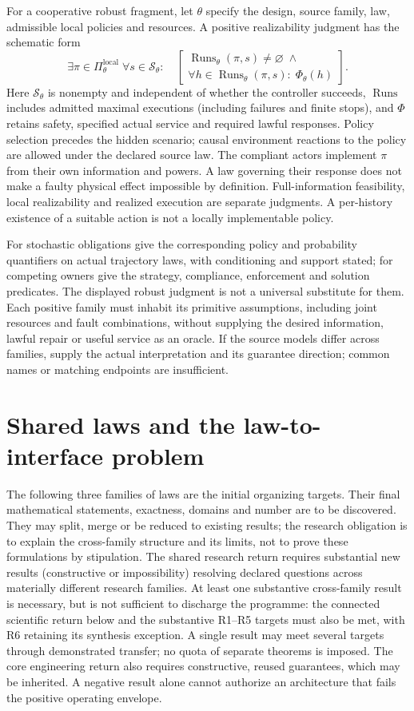 \documentclass[11pt]{article}
\newcommand{\Runs}{\operatorname{Runs}}
\begin{document}
For a cooperative robust fragment, let $\theta$ specify the design, source family, law, admissible local policies and resources. A positive realizability judgment has the schematic form
\[
 \exists\pi\in\Pi^{\mathrm{local}}_\theta\;\forall s\in\mathcal S_\theta:\quad
 \left[\begin{gathered}
 \Runs_\theta(\pi,s)\ne\varnothing\;\land\\
 \forall h\in\Runs_\theta(\pi,s):\;\Phi_\theta(h)
 \end{gathered}\right].
\]
Here $\mathcal S_\theta$ is nonempty and independent of whether the controller succeeds, $\Runs$ includes admitted maximal executions (including failures and finite stops), and $\Phi$ retains safety, specified actual service and required lawful responses. Policy selection precedes the hidden scenario; causal environment reactions to the policy are allowed under the declared source law. The compliant actors implement $\pi$ from their own information and powers. A law governing their response does not make a faulty physical effect impossible by definition. Full-information feasibility, local realizability and realized execution are separate judgments. A per-history existence of a suitable action is not a locally implementable policy.

For stochastic obligations give the corresponding policy and probability quantifiers on actual trajectory laws, with conditioning and support stated; for competing owners give the strategy, compliance, enforcement and solution predicates. The displayed robust judgment is not a universal substitute for them. Each positive family must inhabit its primitive assumptions, including joint resources and fault combinations, without supplying the desired information, lawful repair or useful service as an oracle. If the source models differ across families, supply the actual interpretation and its guarantee direction; common names or matching endpoints are insufficient.

\section{Shared laws and the law-to-interface problem}\label{sec:laws}
The following three families of laws are the initial organizing targets. Their final mathematical statements, exactness, domains and number are to be discovered. They may split, merge or be reduced to existing results; the research obligation is to explain the cross-family structure and its limits, not to prove these formulations by stipulation. The shared research return requires substantial new results (constructive or impossibility) resolving declared questions across materially different research families. At least one substantive cross-family result is necessary, but is not sufficient to discharge the programme: the connected scientific return below and the substantive R1--R5 targets must also be met, with R6 retaining its synthesis exception. A single result may meet several targets through demonstrated transfer; no quota of separate theorems is imposed. The core engineering return also requires constructive, reused guarantees, which may be inherited. A negative result alone cannot authorize an architecture that fails the positive operating envelope.
\end{document}
